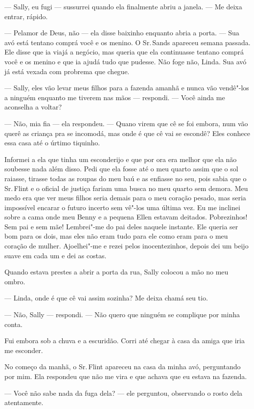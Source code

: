 --- Sally, eu fugi --- sussurrei quando ela finalmente abriu a janela.
--- Me deixa entrar, rápido.

--- Pelamor de Deus, não --- ela disse baixinho enquanto abria a porta.
--- Sua avó está tentano comprá você e os menino. O Sr.\,Sands apareceu
semana passada. Ele disse que ia viajá a negócio, mas queria que ela
continuasse tentano comprá você e os menino e que ia ajudá tudo que
pudesse. Não foge não, Linda. Sua avó já está vexada com probrema que
chegue.

--- Sally, eles vão levar meus filhos
para a fazenda amanhã e nunca vão vendê"-los a ninguém enquanto me
tiverem nas mãos --- respondi. --- Você ainda me aconselha a voltar?

--- Não, mia fia --- ela respondeu. ---
Quano virem que cê se foi embora, num vão querê as criança pra se
incomodá, mas onde é que cê vai se escondê? Eles conhece essa casa até o
úrtimo tiquinho.

Informei a ela que tinha um esconderijo
e que por ora era melhor que ela não soubesse nada além disso. Pedi que
ela fosse até o meu quarto assim que o sol raiasse, tirasse todas as
roupas do meu baú e as enfiasse no seu, pois sabia que o Sr.\,Flint e o
oficial de justiça fariam uma busca no meu quarto sem demora. Meu medo
era que ver meus filhos seria demais para o meu coração pesado, mas
seria impossível encarar o futuro incerto sem vê"-los uma última vez. Eu
me inclinei sobre a cama onde meu Benny e a pequena Ellen estavam
deitados. Pobrezinhos! Sem pai e sem mãe! Lembrei"-me do pai deles
naquele instante. Ele queria ser bom para os dois, mas eles não eram
tudo para ele como eram para o meu coração de mulher. Ajoelhei"-me e
rezei pelos inocentezinhos, depois dei um beijo suave em cada um e dei
as costas.

Quando estava prestes a abrir a porta
da rua, Sally colocou a mão no meu ombro.

--- Linda, onde é que cê vai assim sozinha? Me deixa chamá seu tio.

--- Não, Sally --- respondi. --- Não
quero que ninguém se complique por minha conta.

Fui embora sob a chuva e a escuridão.
Corri até chegar à casa da amiga que iria me esconder.

No começo da manhã, o Sr.\,Flint
apareceu na casa da minha avó, perguntando por mim. Ela respondeu que
não me vira e que achava que eu estava na fazenda.

--- Você não sabe nada da fuga dela? --- ele perguntou, observando o
rosto dela atentamente.

